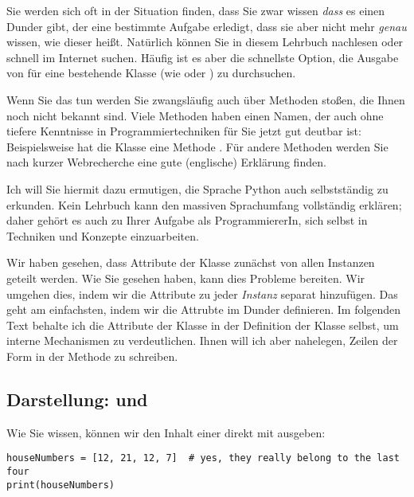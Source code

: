 \begin{hintbox}
Sie werden sich oft in der Situation finden, dass Sie zwar wissen \emph{dass} es einen Dunder gibt, der eine bestimmte Aufgabe erledigt, dass sie aber nicht mehr \emph{genau} wissen, wie dieser heißt. Natürlich können Sie in diesem Lehrbuch nachlesen oder schnell im Internet suchen. Häufig ist es aber die schnellste Option, die Ausgabe von  für eine bestehende Klasse (wie  oder ) zu durchsuchen.

Wenn Sie das tun werden Sie zwangsläufig auch über Methoden stoßen, die Ihnen noch nicht bekannt sind. Viele Methoden haben einen Namen, der auch ohne tiefere Kenntnisse in Programmiertechniken für Sie jetzt gut deutbar ist: Beispielsweise hat die Klasse  eine Methode . Für andere Methoden werden Sie nach kurzer Webrecherche eine gute (\idR englische) Erklärung finden.

Ich will Sie hiermit dazu ermutigen, die Sprache Python auch selbstständig zu erkunden. Kein Lehrbuch kann den massiven Sprachumfang vollständig erklären; daher gehört es auch zu Ihrer Aufgabe als ProgrammiererIn, sich selbst in Techniken und Konzepte einzuarbeiten.
\end{hintbox}

\begin{hintbox}
Wir haben gesehen, dass Attribute der Klasse zunächst von allen Instanzen geteilt werden. Wie Sie gesehen haben, kann dies Probleme bereiten. Wir umgehen dies, indem wir die Attribute zu jeder \emph{Instanz} separat hinzufügen. Das geht am einfachsten, indem wir die Attrubte im Dunder  definieren. Im folgenden Text behalte ich die Attribute der Klasse  in der Definition der Klasse selbst, um interne Mechanismen zu verdeutlichen. Ihnen will ich aber nahelegen, Zeilen der Form  in der Methode  zu schreiben.
\end{hintbox}


\subsection{Darstellung:  und }
Wie Sie wissen, können wir den Inhalt einer  direkt mit  ausgeben:
\begin{codebox}
\begin{verbatim}
houseNumbers = [12, 21, 12, 7]  # yes, they really belong to the last four
print(houseNumbers)
\end{verbatim}
\end{codebox}
\begin{cmdbox}
\end{cmdbox}

